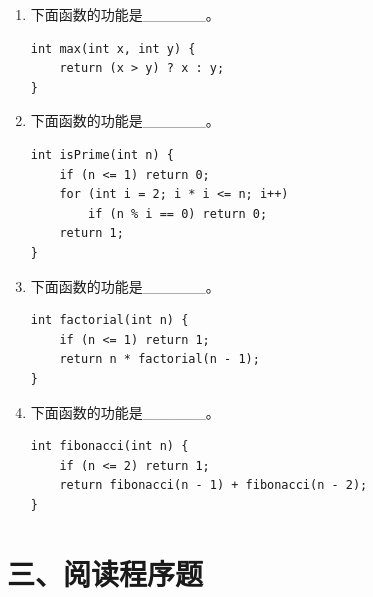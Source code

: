 \documentclass[a4paper,12pt]{article}
\begin{document}
\begin{enumerate}
	\item 下面函数的功能是\_\_\_\_\_\_。
	      \begin{verbatim}
int max(int x, int y) {
    return (x > y) ? x : y;
}
    \end{verbatim}
	      \vspace{0.3cm}

	\item 下面函数的功能是\_\_\_\_\_\_。
	      \begin{verbatim}
int isPrime(int n) {
    if (n <= 1) return 0;
    for (int i = 2; i * i <= n; i++)
        if (n % i == 0) return 0;
    return 1;
}
    \end{verbatim}
	      \vspace{0.3cm}

	\item 下面函数的功能是\_\_\_\_\_\_。
	      \begin{verbatim}
int factorial(int n) {
    if (n <= 1) return 1;
    return n * factorial(n - 1);
}
    \end{verbatim}
	      \vspace{0.3cm}

	\item 下面函数的功能是\_\_\_\_\_\_。
	      \begin{verbatim}
int fibonacci(int n) {
    if (n <= 2) return 1;
    return fibonacci(n - 1) + fibonacci(n - 2);
}
    \end{verbatim}
	      \vspace{0.3cm}
\end{enumerate}

\section*{三、阅读程序题}
\end{document}
